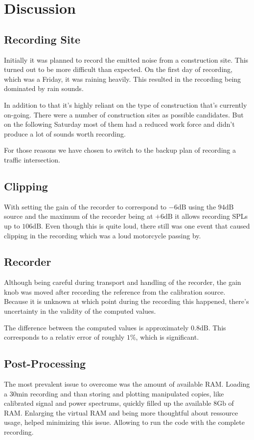 \documentclass[twocolumn]{article}
\begin{document}
\section{Discussion}
\subsection{Recording Site}
Initially it was planned to record the emitted noise from a construction site.
This turned out to be more difficult than expected.
On the first day of recording, which was a Friday, it was raining heavily.
This resulted in the recording being dominated by rain sounds.

In addition to that it's highly reliant on the type of construction that's currently on-going.
There were a number of construction sites as possible candidates.
But on the following Saturday most of them had a reduced work force and didn't produce a lot of sounds
worth recording.

For those reasons we have chosen to switch to the backup plan of recording a traffic intersection.

\subsection{Clipping}
With setting the gain of the recorder to correspond to $-6 \textrm{dB}$ using the $94 \textrm{dB}$ source
and the maximum of the recorder being at $+6 \textrm{dB}$ it allows recording SPLs up to $106 \textrm{dB}$.
Even though this is quite loud, there still was one event that caused clipping in the recording
which was a loud motorcycle passing by.


\subsection{Recorder}
\label{subsec:recorder}
Although being careful during transport and handling of the recorder, the gain knob was moved after
recording the reference from the calibration source.
Because it is unknown at which point during the recording this happened, there's uncertainty
in the validity of the computed values.

The difference between the computed values is approximately $0.8 \textrm{dB}$.
This corresponds to a relativ error of roughly $1\%$, which is significant.


\subsection{Post-Processing}
The most prevalent issue to overcome was the amount of available RAM.
Loading a $30\textrm{min}$ recording and than storing and plotting manipulated copies, like calibrated
signal and power spectrums, quickly filled up the available $8\textrm{Gb}$ of RAM.
Enlarging the virtual RAM and being more thoughtful about ressource usage, helped minimizing this
issue. Allowing to run the code with the complete recording.
\end{document}
